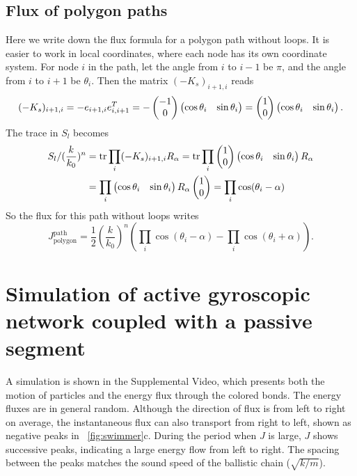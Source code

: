 \documentclass[
 amsmath,amssymb,
 aps,
 pre,
 longbibliography,
 10pt, onecolumn,
 notitlepage
]{revtex4-1}
\begin{document}
\subsection{Flux of polygon paths}
Here we write down the flux formula for a polygon path without loops.
It is easier to work in local coordinates, where each node has its own coordinate system.
For node $i$ in the path, let the angle from $i$ to $i-1$ be $\pi$, and the angle from $i$ to $i+1$ be $\theta_i$.
Then the matrix $(-K_s)_{i+1,i}$ reads
\begin{equation}
    (-K_s)_{i+1,i}
    = -e_{i+1,i} e_{i,i+1}^T
    = -\pmqty{-1 \\ 0} \pmqty{\cos\theta_i & \sin\theta_i}
    = \pmqty{1 \\ 0} \pmqty{\cos\theta_i & \sin\theta_i}.
\end{equation}
The trace in $S_l$ becomes
\begin{equation}
    \begin{split}
    S_l / (\frac{k}{k_0})^n
    &= \tr \prod_i (-K_s)_{i+1,i} R_\alpha
    = \tr \prod_i \pmqty{1 \\ 0} \pmqty{\cos\theta_i & \sin\theta_i} R_\alpha \\
    &= \prod_i \pmqty{\cos\theta_i & \sin\theta_i} R_\alpha \pmqty{1 \\ 0}
    = \prod_i \cos(\theta_i - \alpha)
    \end{split}
\end{equation}
So the flux for this path without loops writes
\begin{equation} \label{eqnS:smallk_path_polygon}
    J^\text{path}_\text{polygon} = \frac{1}{2} (\frac{k}{k_0})^n (\prod_i \cos(\theta_i - \alpha) - \prod_i \cos(\theta_i + \alpha)).
\end{equation}


\section{Simulation of active gyroscopic network coupled with a passive segment}
A simulation is shown in the Supplemental Video, which presents both the motion of particles and the energy flux through the colored bonds.
The energy fluxes are in general random. Although the direction of flux is from left to right on average, the instantaneous flux can also transport from right to left, shown as negative peaks in \figurename~\ref{fig:swimmer}c. During the period when $J$ is large, $J$ shows successive peaks, indicating a large energy flow from left to right. The spacing between the peaks matches the sound speed of the ballistic chain ($\sqrt{k/m}$).
\end{document}
